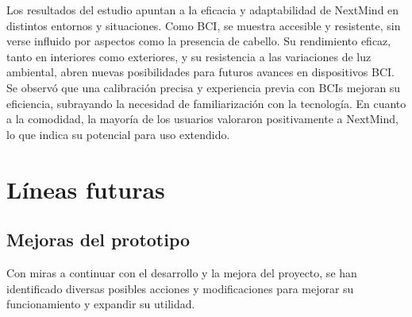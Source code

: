  Los resultados del estudio apuntan a la eficacia y adaptabilidad de NextMind en distintos entornos y situaciones. Como BCI, se muestra accesible y resistente, sin verse influido por aspectos como la presencia de cabello. Su rendimiento eficaz, tanto en interiores como exteriores, y su resistencia a las variaciones de luz ambiental, abren nuevas posibilidades para futuros avances en dispositivos BCI. Se observó que una calibración precisa y experiencia previa con BCIs mejoran su eficiencia, subrayando la necesidad de familiarización con la tecnología. En cuanto a la comodidad, la mayoría de los usuarios valoraron positivamente a NextMind, lo que indica su potencial para uso extendido.


\section{Líneas futuras}

\subsection{Mejoras del prototipo}

Con miras a continuar con el desarrollo y la mejora del proyecto, se han identificado diversas posibles acciones y modificaciones para mejorar su funcionamiento y expandir su utilidad.

